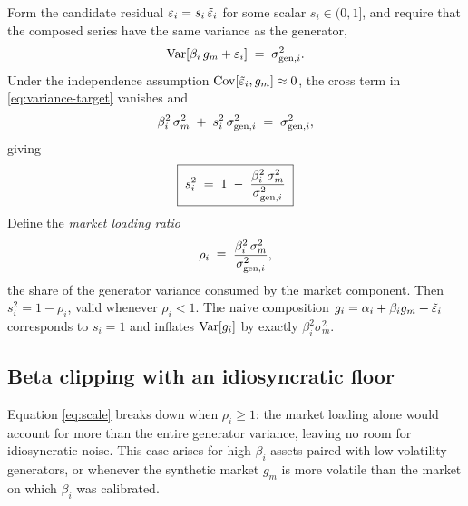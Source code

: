 Form the candidate residual $\varepsilon_i = s_i\,\tilde{\varepsilon}_i$ for some scalar
$s_i \in (0, 1]$, and require that the composed series have the same
variance as the generator,
\begin{equation}
  \operatorname{Var}[\beta_i\, g_m + \varepsilon_i] \;=\; \sigma_{\mathrm{gen},i}^2.
  \label{eq:variance-target}
\end{equation}
Under the independence assumption $\operatorname{Cov}[\tilde{\varepsilon}_i, g_m] \approx 0$,
the cross term in \eqref{eq:variance-target} vanishes and
\begin{equation}
  \beta_i^2\, \sigma_m^2 \;+\; s_i^2\, \sigma_{\mathrm{gen},i}^2 \;=\; \sigma_{\mathrm{gen},i}^2,
\end{equation}
giving
\begin{equation}
  \boxed{\;s_i^2 \;=\; 1 \;-\; \frac{\beta_i^2\, \sigma_m^2}{\sigma_{\mathrm{gen},i}^2}\;}
  \label{eq:scale}
\end{equation}
Define the \emph{market loading ratio}
\begin{equation}
  \rho_i \;\equiv\; \frac{\beta_i^2\, \sigma_m^2}{\sigma_{\mathrm{gen},i}^2},
  \label{eq:rho}
\end{equation}
the share of the generator variance consumed by the market component. Then
$s_i^2 = 1 - \rho_i$, valid whenever $\rho_i < 1$. The naive composition
$g_i = \alpha_i + \beta_i g_m + \tilde{\varepsilon}_i$ corresponds to $s_i = 1$ and
inflates $\operatorname{Var}[g_i]$ by exactly $\beta_i^2 \sigma_m^2$.

\subsection{Beta clipping with an idiosyncratic floor}
\label{sec:method-clipping}

Equation \eqref{eq:scale} breaks down when $\rho_i \ge 1$: the market loading
alone would account for more than the entire generator variance, leaving no
room for idiosyncratic noise. This case arises for high-$\beta_i$ assets
paired with low-volatility generators, or whenever the synthetic market
$g_m$ is more volatile than the market on which $\beta_i$ was calibrated.

